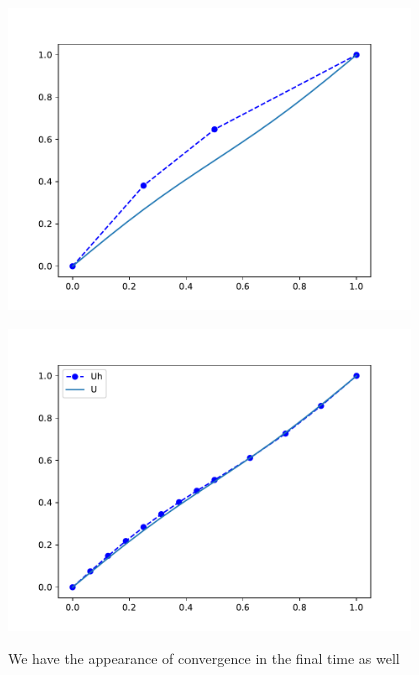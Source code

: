 \documentclass{uonmathreport}
\theoremstyle{definition}
\theoremstyle{problem}
\theoremstyle{theorem}
\begin{document}
\begin{figure}
\caption{We have the appearance of convergence in the final time as well}
\begin{minipage}{0.49\hsize}
   \includegraphics[width=0.95\textwidth]{Heat2FinalTimeCoarse.pdf}
  \end{minipage}
  \hfill
    \begin{minipage}{0.49\hsize}
    \includegraphics[width=0.95\textwidth]{Heat2FinalTimeFine.pdf}
  \label{fig:heat2_final}
\end{minipage}
    \end{figure}
    
\end{document}
